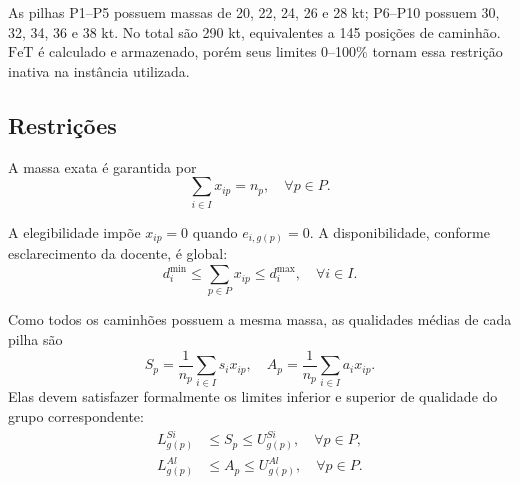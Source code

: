 \documentclass[10pt,twocolumn,a4paper]{article}
\begin{document}
\begin{table}[H]
\centering
\caption{Especificações químicas por grupo.}
\label{tab:espec_quimicas}
\end{table}

As pilhas P1--P5 possuem massas de 20, 22, 24, 26 e 28 kt; P6--P10 possuem 30, 32, 34, 36 e 38 kt. No total são 290 kt, equivalentes a 145 posições de caminhão. $\text{FeT}$ é calculado e armazenado, porém seus limites 0--100\% tornam essa restrição inativa na instância utilizada.

\subsection{Restrições}

A massa exata é garantida por
\begin{equation}
\sum_{i \in I} x_{ip} = n_p, \quad \forall p \in P.
\end{equation}

A elegibilidade impõe $x_{ip} = 0$ quando $e_{i,g(p)} = 0$. A disponibilidade, conforme esclarecimento da docente, é global:
\begin{equation}
d_i^{\min} \le \sum_{p \in P} x_{ip} \le d_i^{\max}, \quad \forall i \in I.
\end{equation}

Como todos os caminhões possuem a mesma massa, as qualidades médias de cada pilha são
\begin{equation}
S_p = \frac{1}{n_p} \sum_{i \in I} s_i x_{ip}, \quad A_p = \frac{1}{n_p} \sum_{i \in I} a_i x_{ip}.
\end{equation}
Elas devem satisfazer formalmente os limites inferior e superior de qualidade do grupo correspondente:
\begin{align}
L_{g(p)}^{Si} &\le S_p \le U_{g(p)}^{Si}, \quad \forall p \in P, \\
L_{g(p)}^{Al} &\le A_p \le U_{g(p)}^{Al}, \quad \forall p \in P.
\end{align}
\end{document}
